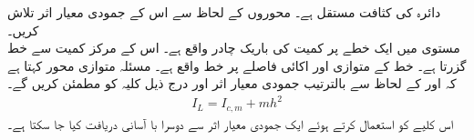 دائرہ   کی کثافت مستقل ہے۔ محوروں کے لحاظ سے اس کے جمودی معیار اثر تلاش کریں۔ 
\\
مستوی  میں  ایک خطے   پر  کمیت  کی باریک چادر واقع ہے۔ اس کے مرکز کمیت سے خط   گزرتا ہے۔ خط  کے متوازی   اور   اکائی فاصلے پر خط  واقع ہے۔ مسئلہ متوازی محور کہتا ہے  کہ  اور  کے لحاظ سے  بالترتیب جمودی معیار اثر  اور  درج ذیل کلیہ کو مطمئن کریں گے۔
\begin{align}
I_L=I_{c,m}+mh^2
\end{align}
اس کلیے کو استعمال کرتے ہوئے ایک جمودی معیار اثر سے دوسرا با آسانی دریافت کیا جا سکتا ہے۔


